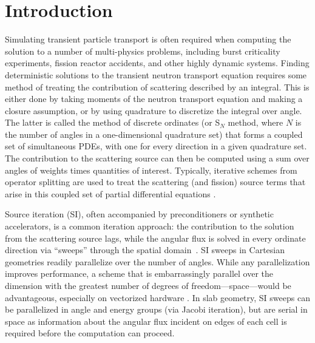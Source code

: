 \section{Introduction}

Simulating transient particle transport is often required when computing the solution to a number of multi-physics problems, including burst criticality experiments, fission reactor accidents, and other highly dynamic systems.
Finding deterministic solutions to the transient neutron transport equation requires some method of treating the contribution of scattering described by an integral.
This is either done by taking moments of the neutron transport equation and making a closure assumption, or by using quadrature to discretize the integral over angle.
The latter is called the method of discrete ordinates (or S$_N$ method, where $N$ is the number of angles in a one-dimensional quadrature set) that forms a coupled set of simultaneous PDEs, with one for every direction in a given quadrature set.
The contribution to the scattering source can then be computed using a sum over angles of weights times quantities of interest.
Typically, iterative schemes from operator splitting are used to treat the scattering (and fission) source terms that arise in this coupled set of partial differential equations \cite{lewis_computational_1984}.

Source iteration (SI), often accompanied by preconditioners or synthetic accelerators, is a common iteration approach: the contribution to the solution from the scattering source lags, while the angular flux is solved in every ordinate direction via ``sweeps'' through the spatial domain~\cite{adams_subcell_1997}.
SI sweeps in Cartesian geometries readily parallelize over the number of angles.
While any parallelization improves performance, a scheme that is embarrassingly parallel over the dimension with the greatest number of degrees of freedom---space---would be advantageous, especially on vectorized hardware \cite{rosa_cellwise_2013, hoagland_hybrid_2021}.
In slab geometry, SI sweeps can be parallelized in angle and energy groups (via Jacobi iteration), but are serial in space as information about the angular flux incident on edges of each cell is required before the computation can proceed.

